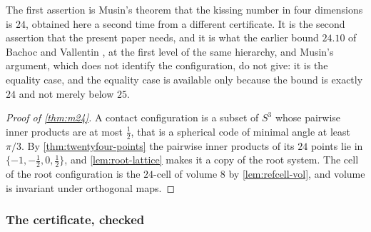 \documentclass[11pt,reqno]{amsart}
\renewcommand{\_}{\origunderscore\allowbreak}
\numberwithin{equation}{section}
\theoremstyle{plain}
\theoremstyle{definition}
\theoremstyle{remark}
\begin{document}
The first assertion is Musin's theorem \cite{Mus08} that the kissing
number in four dimensions is $24$, obtained here a second time from a
different certificate. It is the second assertion that the present paper
needs, and it is what the earlier bound $24.10$ of Bachoc and Vallentin
\cite{BV08}, at the first level of the same hierarchy, and Musin's
argument, which does not identify the configuration, do not give: it is
the equality case, and the equality case is available only because the
bound is exactly $24$ and not merely below $25$.

\begin{proof}[Proof of \cref{thm:m24}]
A contact configuration is a subset of $S^3$ whose pairwise inner
products are at most $\tfrac12$, that is a spherical code of minimal
angle at least $\pi/3$. By \cref{thm:twentyfour-points} the pairwise
inner products of its $24$ points lie in $\{-1,-\tfrac12,0,\tfrac12\}$, and
\cref{lem:root-lattice} makes it a copy of the root system. The cell of
the root configuration is the $24$-cell of volume $8$ by
\cref{lem:refcell-vol}, and volume is invariant under orthogonal maps.
\end{proof}

\subsubsection{The certificate, checked}
\label{sec:certificate-checked}
\end{document}
